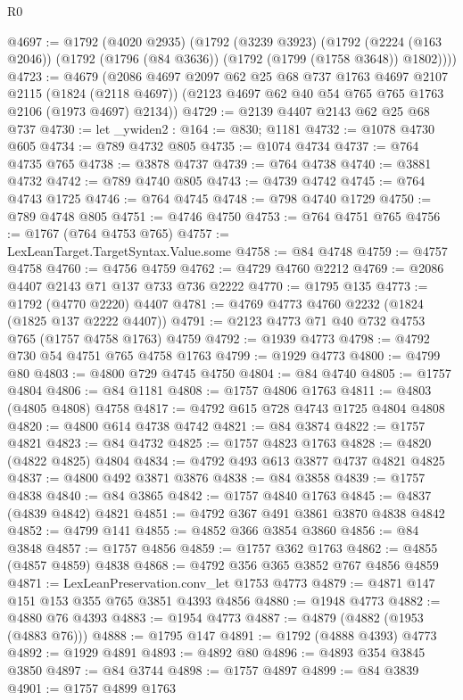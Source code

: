 \begin{lexlean}{R0}
\begin{coremodule}
{{{{{@4697 := @1792
    (@4020 @2935)
    (@1792
      (@3239 @3923)
      (@1792 (@2224 (@163 @2046)) (@1792 (@1796 (@84 @3636)) (@1792 (@1799 (@1758 @3648)) @1802))))
@4723 := @4679
    (@2086
      @4697
      @2097
      @62
      @25
      @68
      @737
      @1763
      @4697
      @2107
      @2115
      (@1824 (@2118 @4697))
      (@2123 @4697 @62 @40 @54 @765 @765 @1763 @2106 (@1973 @4697) @2134))
@4729 := @2139 @4407 @2143 @62 @25 @68 @737
@4730 := let _ywiden2 : @164 := @830; @1181
@4732 := @1078 @4730 @605
@4734 := @789 @4732 @805
@4735 := @1074 @4734
@4737 := @764 @4735 @765
@4738 := @3878 @4737
@4739 := @764 @4738
@4740 := @3881 @4732
@4742 := @789 @4740 @805
@4743 := @4739 @4742
@4745 := @764 @4743 @1725
@4746 := @764 @4745
@4748 := @798 @4740 @1729
@4750 := @789 @4748 @805
@4751 := @4746 @4750
@4753 := @764 @4751 @765
@4756 := @1767 (@764 @4753 @765)
@4757 := LexLeanTarget.TargetSyntax.Value.some
@4758 := @84 @4748
@4759 := @4757 @4758
@4760 := @4756 @4759
@4762 := @4729 @4760 @2212
@4769 := @2086 @4407 @2143 @71 @137 @733 @736 @2222
@4770 := @1795 @135
@4773 := @1792 (@4770 @2220) @4407
@4781 := @4769 @4773 @4760 @2232 (@1824 (@1825 @137 @2222 @4407))
@4791 := @2123 @4773 @71 @40 @732 @4753 @765 (@1757 @4758 @1763) @4759
@4792 := @1939 @4773
@4798 := @4792 @730 @54 @4751 @765 @4758 @1763
@4799 := @1929 @4773
@4800 := @4799 @80
@4803 := @4800 @729 @4745 @4750
@4804 := @84 @4740
@4805 := @1757 @4804
@4806 := @84 @1181
@4808 := @1757 @4806 @1763
@4811 := @4803 (@4805 @4808) @4758
@4817 := @4792 @615 @728 @4743 @1725 @4804 @4808
@4820 := @4800 @614 @4738 @4742
@4821 := @84 @3874
@4822 := @1757 @4821
@4823 := @84 @4732
@4825 := @1757 @4823 @1763
@4828 := @4820 (@4822 @4825) @4804
@4834 := @4792 @493 @613 @3877 @4737 @4821 @4825
@4837 := @4800 @492 @3871 @3876
@4838 := @84 @3858
@4839 := @1757 @4838
@4840 := @84 @3865
@4842 := @1757 @4840 @1763
@4845 := @4837 (@4839 @4842) @4821
@4851 := @4792 @367 @491 @3861 @3870 @4838 @4842
@4852 := @4799 @141
@4855 := @4852 @366 @3854 @3860
@4856 := @84 @3848
@4857 := @1757 @4856
@4859 := @1757 @362 @1763
@4862 := @4855 (@4857 @4859) @4838
@4868 := @4792 @356 @365 @3852 @767 @4856 @4859
@4871 := LexLeanPreservation.conv_let @1753 @4773
@4879 := @4871 @147 @151 @153 @355 @765 @3851 @4393 @4856
@4880 := @1948 @4773
@4882 := @4880 @76 @4393
@4883 := @1954 @4773
@4887 := @4879 (@4882 (@1953 (@4883 @76)))
@4888 := @1795 @147
@4891 := @1792 (@4888 @4393) @4773
@4892 := @1929 @4891
@4893 := @4892 @80
@4896 := @4893 @354 @3845 @3850
@4897 := @84 @3744
@4898 := @1757 @4897
@4899 := @84 @3839
@4901 := @1757 @4899 @1763
}}}}}
\end{coremodule}
\end{lexlean}
